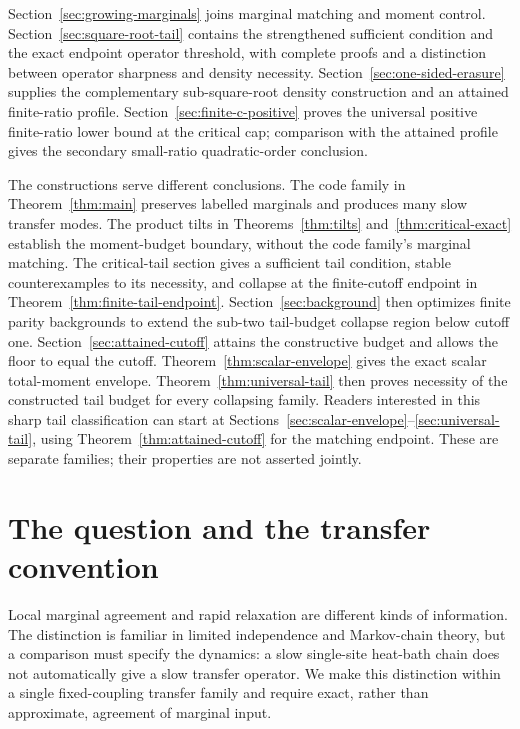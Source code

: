 \documentclass[11pt]{article}
\begin{document}
Section~\ref{sec:growing-marginals} joins marginal matching and moment control. Section~\ref{sec:square-root-tail} contains the strengthened sufficient condition and the exact endpoint operator threshold, with complete proofs and a distinction between operator sharpness and density necessity. Section~\ref{sec:one-sided-erasure} supplies the complementary sub-square-root density construction and an attained finite-ratio profile. Section~\ref{sec:finite-c-positive} proves the universal positive finite-ratio lower bound at the critical cap; comparison with the attained profile gives the secondary small-ratio quadratic-order conclusion.

The constructions serve different conclusions. The code family in
Theorem~\ref{thm:main} preserves labelled marginals and produces many slow
transfer modes. The product tilts in Theorems~\ref{thm:tilts}
and~\ref{thm:critical-exact} establish the moment-budget boundary, without
the code family's marginal matching. The critical-tail section gives a sufficient
tail condition, stable counterexamples to its necessity, and collapse at
the finite-cutoff endpoint in Theorem~\ref{thm:finite-tail-endpoint}.
Section~\ref{sec:background} then optimizes finite parity backgrounds
to extend the sub-two tail-budget collapse region below cutoff one.
Section~\ref{sec:attained-cutoff} attains the constructive budget
and allows the floor to equal the cutoff. Theorem~\ref{thm:scalar-envelope}
gives the exact scalar total-moment envelope. Theorem~\ref{thm:universal-tail}
then proves necessity of the constructed tail budget for every collapsing
family. Readers interested in this sharp tail classification can start at
Sections~\ref{sec:scalar-envelope}--\ref{sec:universal-tail}, using
Theorem~\ref{thm:attained-cutoff} for the matching endpoint.
These are separate families; their properties are not asserted jointly.

\section{The question and the transfer convention}
Local marginal agreement and rapid relaxation are different kinds of
information. The distinction is familiar in limited independence and
Markov-chain theory, but a comparison must specify the dynamics: a slow
single-site heat-bath chain does not automatically give a slow transfer
operator. We make this distinction within a single fixed-coupling transfer
family and require exact, rather than approximate, agreement of marginal
input.
\end{document}
